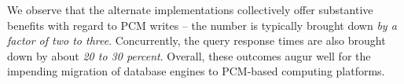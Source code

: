 We observe that the alternate implementations collectively offer
substantive benefits with regard to PCM writes -- the number is typically
brought down \emph{by a factor of two to three}.  Concurrently, the query
response times are also brought down by about \emph{20 to 30 percent}. Overall, these outcomes augur well for the impending migration of database
engines to PCM-based computing platforms.

 
 
 
\begin{comment}
 Our 

The experimental results suggest that, as compared to the original
PCM-oblivious operators, 
As a sample case in point, for TPC-H Query 19, savings of 64\% in PCM
writes are achieved with a concomitant 32\% reduction in CPU cycles.

A unique feature of our analysis is that we also . This is because
a skewed distribution adversely impacts the endurance of cells with high
write rates, raising the frequency at which wear-leveling mechanisms
have to be put into play by the system. We observe that our algorithms don't introduce any new skew while achieving the reduction in writes and cycles.

Finally, 

In a nutshell, the new PCM-conscious operators proposed in this paper
provide both \emph{short-term and long-term performance benefits}.

\end{comment}